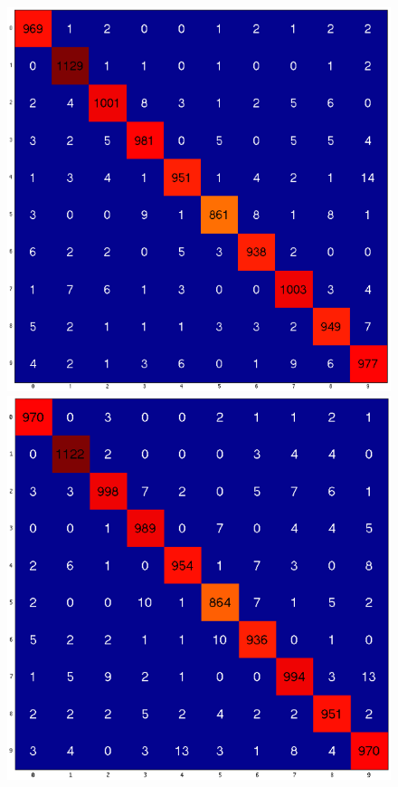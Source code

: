 \documentclass[10pt,twocolumn,letterpaper]{article}
\begin{document}
\begin{figure}
\begin{center}
	\includegraphics[scale=0.25]{../images/confusion_2_1.png}
	\includegraphics[scale=0.25]{../images/confusion_3.png}

\end{center}
\end{figure}
\end{document}
